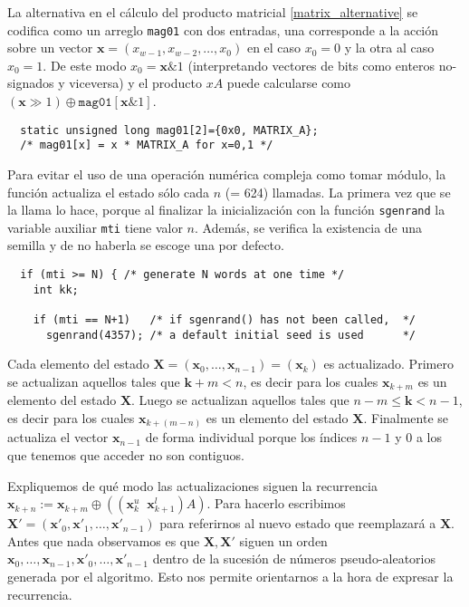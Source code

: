 \documentclass{article}
\DeclareMathOperator{\concat}{||}
\DeclareMathOperator{\bitand}{\&}
\begin{document}
La alternativa en el cálculo del producto matricial \ref{matrix_alternative} se codifica como un arreglo \verb#mag01# con dos entradas, una corresponde a la acción sobre un vector $\mathbf{x} = (x_{w - 1}, x_{w - 2}, \dots, x_0)$ en el caso $x_0 = 0$ y la otra al caso $x_0 = 1$.
De este modo $x_0 = \mathbf{x} \bitand 1$ (interpretando vectores de bits como enteros no-signados y viceversa) y el producto $x A$ puede calcularse como $(\mathbf{x} \gg 1) \oplus \texttt{mag01}[\mathbf{x} \bitand 1]$.
\begin{verbatim}
  static unsigned long mag01[2]={0x0, MATRIX_A};
  /* mag01[x] = x * MATRIX_A for x=0,1 */
\end{verbatim}

Para evitar el uso de una operación numérica compleja como tomar módulo, la función actualiza el estado sólo cada $n$ (= 624) llamadas.
La primera vez que se la llama lo hace, porque al finalizar la inicialización con la función \verb#sgenrand# la variable auxiliar \verb#mti# tiene valor $n$.
Además, se verifica la existencia de una semilla y de no haberla se escoge una por defecto.
\begin{verbatim}
  if (mti >= N) { /* generate N words at one time */
    int kk;

    if (mti == N+1)   /* if sgenrand() has not been called,  */
      sgenrand(4357); /* a default initial seed is used      */
\end{verbatim}

Cada elemento del estado $\mathbf{X} = (\mathbf{x}_0, \dots, \mathbf{x}_{n - 1}) = (\mathbf{x}_k)$ es actualizado.
Primero se actualizan aquellos tales que $\mathbf{k} + m < n$, es decir para los cuales $\mathbf{x}_{k + m}$ es un elemento del estado $\mathbf{X}$.
Luego se actualizan aquellos tales que $n - m \leq \mathbf{k} < n - 1$, es decir para los cuales $\mathbf{x}_{k + (m - n)}$ es un elemento del estado $\mathbf{X}$.
Finalmente se actualiza el vector $\mathbf{x}_{n - 1}$ de forma individual porque los índices $n - 1$ y $0$ a los que tenemos que acceder no son contiguos.

Expliquemos de qué modo las actualizaciones siguen la recurrencia $\mathbf{x}_{k + n} := \mathbf{x}_{k + m} \oplus ((\mathbf{x}_k^u \concat \mathbf{x}_{k + 1}^l) A)$.
Para hacerlo escribimos $\mathbf{X'} = (\mathbf{x'}_0, \mathbf{x'}_1, \dots, \mathbf{x'}_{n - 1})$ para referirnos al nuevo estado que reemplazará a $\mathbf{X}$.
Antes que nada observamos es que $\mathbf{X}, \mathbf{X'}$ siguen un orden $\mathbf{x}_0, \dots, \mathbf{x}_{n - 1}, \mathbf{x'}_0, \dots, \mathbf{x'}_{n - 1}$ dentro de la sucesión de números pseudo-aleatorios generada por el algoritmo.
Esto nos permite orientarnos a la hora de expresar la recurrencia.
\end{document}
